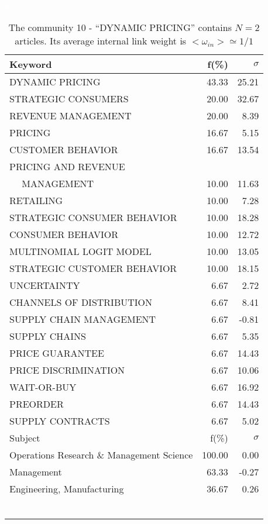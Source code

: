 \documentclass[a4paper,11pt]{report}
\begin{document}
\begin{landscape}
\begin{table}[!ht]
\caption{The community 10 - ``DYNAMIC PRICING'' contains $N = 2$ articles. Its average internal link weight is $<\omega_{in}> \simeq 1/1$ }
\textcolor{white}{aa}\\
{\scriptsize\begin{tabular}{|l r r|}
\hline
Keyword & f(\%) & $\sigma$\\
\hline
DYNAMIC PRICING & 43.33 & 25.21\\
STRATEGIC CONSUMERS & 20.00 & 32.67\\
REVENUE MANAGEMENT & 20.00 & 8.39\\
PRICING & 16.67 & 5.15\\
CUSTOMER BEHAVIOR & 16.67 & 13.54\\
PRICING AND REVENUE &  & \\
$\quad$ MANAGEMENT & 10.00 & 11.63\\
RETAILING & 10.00 & 7.28\\
STRATEGIC CONSUMER BEHAVIOR & 10.00 & 18.28\\
CONSUMER BEHAVIOR & 10.00 & 12.72\\
MULTINOMIAL LOGIT MODEL & 10.00 & 13.05\\
STRATEGIC CUSTOMER BEHAVIOR & 10.00 & 18.15\\
UNCERTAINTY & 6.67 & 2.72\\
CHANNELS OF DISTRIBUTION & 6.67 & 8.41\\
SUPPLY CHAIN MANAGEMENT & 6.67 & -0.81\\
SUPPLY CHAINS & 6.67 & 5.35\\
PRICE GUARANTEE & 6.67 & 14.43\\
PRICE DISCRIMINATION & 6.67 & 10.06\\
WAIT-OR-BUY & 6.67 & 16.92\\
PREORDER & 6.67 & 14.43\\
SUPPLY CONTRACTS & 6.67 & 5.02\\
\hline
\hline
Subject & f(\%) & $\sigma$\\
\hline
Operations Research \& Management Science & 100.00 & 0.00\\
Management & 63.33 & -0.27\\
Engineering, Manufacturing & 36.67 & 0.26\\
 &  & \\
 &  & \\
 &  & \\
 &  & \\
 &  & \\
 &  & \\

\end{tabular}}
\end{table}
\end{landscape}
\end{document}
